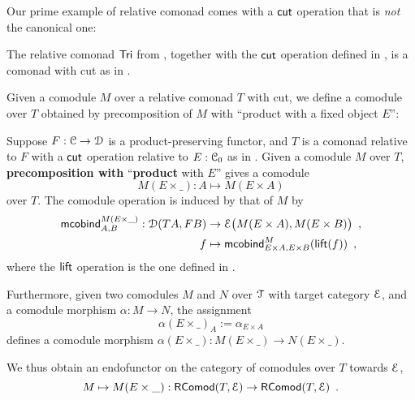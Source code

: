 \documentclass[a4paper,USenglish]{lipics}
\newcommand{\fat}[1]{\textbf{#1}}
\begin{document}
\begin{Long}
Our prime example of relative comonad comes with a $\mathsf{cut}$ operation that is \emph{not} the canonical one:
\end{Long}

\begin{ex}%
\label{def:cut_for_tri}
  The relative comonad $\mathsf{Tri}$ from , together with the $\mathsf{cut}$ operation defined in , 
  is a comonad with cut as in .
\end{ex}





Given a comodule $M$ over a relative comonad $T$ with cut, we define a comodule over $T$ obtained by precomposition of $M$ with
\enquote{product with a fixed object $E$}:


\begin{defn}%
\label{def:product_in_context}
 Suppose $F:{\mathcal{C}}\to\mathcal{D}$ is a product-preserving functor, and $T$ is a comonad relative to $F$ with a $\mathsf{cut}$ operation 
 relative to $E:{\mathcal{C}}_0$ as in .
 Given a comodule $M$ over $T$,  \fat{precomposition with} \enquote{\fat{product} with $E$}
 gives a comodule 
   \[ M(E\times\_) : A \mapsto M(E\times A) \] over $T$.
 The comodule operation is induced by that of $M$ by 
 \begin{align*} \mathsf{mcobind}^{M(E\times\_)}_{A,B} : \mathcal{D}(TA,FB)&\to \mathcal{E}\bigl(M(E\times A), M(E\times B)\bigr) \enspace ,\\ 
                                                      f &\mapsto \mathsf{mcobind}^M_{E\times A,E\times B}(\mathsf{lift}(f)) \enspace ,
  \end{align*}                                        
where the $\mathsf{lift}$ operation is the one defined in .
 
 Furthermore, given two comodules $M$ and $N$ over $\mathcal{T}$ with target category $\mathcal{E}$, and a comodule morphism $\alpha : M \to N$,  
 the assignment \[ \alpha(E \times \_)_A := \alpha_{E\times A} \] defines a comodule morphism 
  $\alpha(E\times \_) : M(E\times \_) \to N(E\times \_) $.

\begin{Long}
  \noindent
  We thus obtain an endofunctor on the category of comodules over $T$ towards $\mathcal{E}$,
   \[ M \mapsto  M (E\times \_) : \mathsf{RComod}(T,\mathcal{E}) \to \mathsf{RComod}(T,\mathcal{E}) \enspace . \]
\end{Long}
\end{defn}
\end{document}

